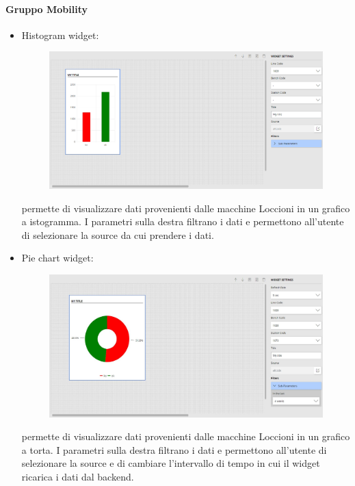 \paragraph{Gruppo Mobility}
\begin{itemize}
    \item Histogram widget: 
    
\begin{figure}[ht]
\centering
\includegraphics[scale=0.265]{images/Histogram.png}
\end{figure}
permette di visualizzare dati provenienti dalle macchine Loccioni in un grafico a istogramma. I parametri sulla destra filtrano i dati e permettono all'utente di selezionare la source da cui prendere i dati.
\end{itemize}
\pagebreak
\begin{itemize}
    \item Pie chart widget: 
    
\begin{figure}[ht]
\centering
\includegraphics[scale=0.32]{images/Piechart.JPG}
\end{figure}
permette di visualizzare dati provenienti dalle macchine Loccioni in un grafico a torta. I parametri sulla destra filtrano i dati e permettono all'utente di selezionare la source e di cambiare l'intervallo di tempo in cui il widget ricarica i dati dal backend.
\end{itemize}
